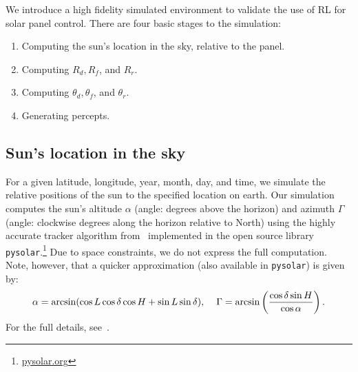 \documentclass{article}
\begin{document}
{We introduce a high fidelity simulated environment to validate the use of RL for solar panel control. There are four basic stages to the simulation:
\begin{enumerate}
\item Computing the sun's location in the sky, relative to the panel.
\item Computing $R_d, R_f$, and $R_r$.
\item Computing $\theta_d, \theta_f$, and $\theta_r$.
\item Generating percepts.
\end{enumerate}

\subsection{Sun's location in the sky}
For a given latitude, longitude, year, month, day, and time, we simulate the relative positions of the sun to the specified location on earth. Our simulation computes the sun's altitude $\alpha$ (angle: degrees above the horizon) and azimuth $\Gamma$ (angle: clockwise degrees along the horizon relative to North) using the highly accurate tracker algorithm from~\citet{reda2004solar} implemented in the open source library \texttt{pysolar}.\footnote{\url{pysolar.org}} Due to space constraints, we do not express the full computation. Note, however, that a quicker approximation (also available in \texttt{pysolar}) is given by:
\begin{align}
\alpha = \arcsin(\cos L \cos \delta \cos H + \sin L \sin \delta), \hspace{4mm} \Gamma = \arcsin\left(\frac{\cos \delta \sin H}{\cos \alpha}\right).
\end{align}
For the full details, see~\citet{reda2004solar}.

}
\end{document}
